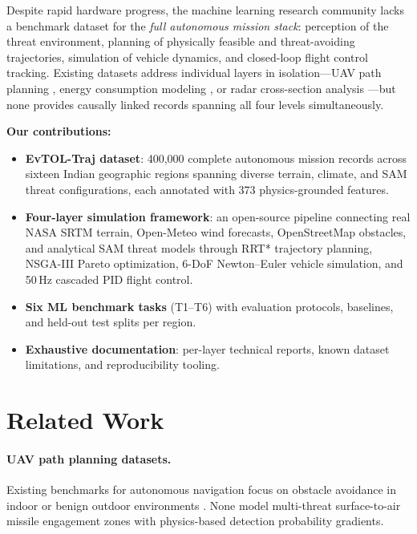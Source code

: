 \documentclass{article}
\begin{document}
Despite rapid hardware progress, the machine learning research community
lacks a benchmark dataset for the \emph{full autonomous mission stack}:
perception of the threat environment, planning of physically feasible and
threat-avoiding trajectories, simulation of vehicle dynamics, and closed-loop
flight control tracking.
Existing datasets address individual layers in isolation---UAV path planning
\citep{ong2021uav}, energy consumption modeling \citep{rodrigues2021energy},
or radar cross-section analysis \citep{skolnik2008radar}---but none provides
causally linked records spanning all four levels simultaneously.

\textbf{Our contributions:}
\begin{itemize}
  \item \textbf{EvTOL-Traj dataset}: 400{,}000 complete autonomous mission
    records across sixteen Indian geographic regions spanning diverse terrain,
    climate, and SAM threat configurations, each annotated with 373 physics-grounded features.
  \item \textbf{Four-layer simulation framework}: an open-source pipeline
    connecting real NASA SRTM terrain, Open-Meteo wind forecasts, OpenStreetMap
    obstacles, and analytical SAM threat models through RRT*
    \citep{karaman2011sampling} trajectory planning, NSGA-III
    \citep{deb2014evolutionary} Pareto optimization, 6-DoF Newton--Euler
    vehicle simulation, and 50\,Hz cascaded PID flight control.
  \item \textbf{Six ML benchmark tasks} (T1--T6) with evaluation protocols,
    baselines, and held-out test splits per region.
  \item \textbf{Exhaustive documentation}: per-layer technical reports,
    known dataset limitations, and reproducibility tooling.
\end{itemize}

\section{Related Work}
\label{sec:related}

\paragraph{UAV path planning datasets.}
Existing benchmarks for autonomous navigation focus on obstacle avoidance
in indoor or benign outdoor environments \citep{ong2021uav,sun2022motion}.
None model multi-threat surface-to-air missile engagement zones with
physics-based detection probability gradients.
\end{document}
